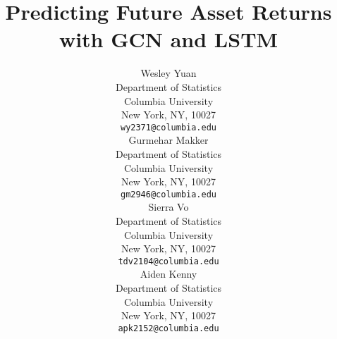 \title{Predicting Future Asset Returns with GCN and LSTM} %
\author{%
  Wesley Yuan \\
  Department of Statistics \\
  Columbia University \\
  New York, NY, 10027 \\
  \texttt{wy2371@columbia.edu} \\
  \And
  Gurmehar Makker \\
  Department of Statistics \\
  Columbia University \\
  New York, NY, 10027 \\
  \texttt{gm2946@columbia.edu} \\
  \And
  Sierra Vo \\
  Department of Statistics \\
  Columbia University \\
  New York, NY, 10027 \\
  \texttt{tdv2104@columbia.edu} \\
  \And
  Aiden Kenny \\
  Department of Statistics \\
  Columbia University \\
  New York, NY, 10027 \\
  \texttt{apk2152@columbia.edu} \\
}

\maketitle